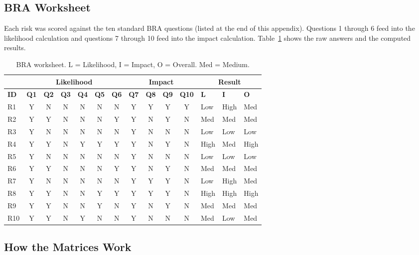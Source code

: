 \subsection*{BRA Worksheet}

Each risk was scored against the ten standard BRA questions (listed at the end of this appendix). Questions 1 through 6 feed into the likelihood calculation and questions 7 through 10 feed into the impact calculation. Table~\ref{tab:bra-worksheet} shows the raw answers and the computed results.

\begin{table}[H]
\centering
\footnotesize
\begin{tabular}{|l|c|c|c|c|c|c|c|c|c|c|l|l|l|}
\hline
\rowcolor{gray!20}  & \multicolumn{6}{c|}{\textbf{Likelihood}} & \multicolumn{4}{c|}{\textbf{Impact}} & \multicolumn{3}{c|}{\textbf{Result}} \\
\hline
\rowcolor{gray!20} \textbf{ID} & \textbf{Q1} & \textbf{Q2} & \textbf{Q3} & \textbf{Q4} & \textbf{Q5} & \textbf{Q6} & \textbf{Q7} & \textbf{Q8} & \textbf{Q9} & \textbf{Q10} & \textbf{L} & \textbf{I} & \textbf{O} \\
\hline
R1 & Y & N & N & N & N & N & Y & Y & Y & Y & Low & High & Med \\
\hline
R2 & Y & Y & N & N & N & Y & Y & N & Y & N & Med & Med & Med \\
\hline
R3 & Y & N & N & N & N & N & Y & N & N & N & Low & Low & Low \\
\hline
R4 & Y & Y & N & Y & Y & Y & Y & N & Y & N & High & Med & High \\
\hline
R5 & Y & N & N & N & N & N & Y & N & N & N & Low & Low & Low \\
\hline
R6 & Y & Y & N & N & N & Y & Y & N & Y & N & Med & Med & Med \\
\hline
R7 & Y & N & N & N & N & N & Y & Y & Y & N & Low & High & Med \\
\hline
R8 & Y & Y & N & N & Y & Y & Y & Y & Y & N & High & High & High \\
\hline
R9 & Y & Y & N & N & Y & N & Y & N & Y & N & Med & Med & Med \\
\hline
R10 & Y & Y & N & Y & N & N & Y & N & N & N & Med & Low & Med \\
\hline
\end{tabular}
\caption{BRA worksheet. L = Likelihood, I = Impact, O = Overall. Med = Medium.}
\label{tab:bra-worksheet}
\end{table}

\subsection*{How the Matrices Work}

